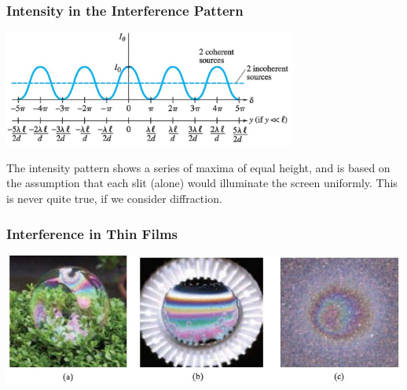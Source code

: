 \documentclass[]{beamer}
\begin{document}


\begin{frame}

\frametitle{Intensity in the Interference Pattern}

  \begin{center}
  \includegraphics[height=1.5in]{images5/intensity.jpg}
\end{center}

\pause

The intensity pattern shows a series of maxima of equal height, and is based on the assumption that
each slit (alone) would illuminate the screen uniformly. This is never quite true, if we consider  diffraction. 



  \end{frame}






\begin{frame}

\frametitle{Interference in Thin Films}

  \begin{center}
  \includegraphics[height=1.7in]{images5/soap.jpg}
\end{center}


  \end{frame}


\end{document}
